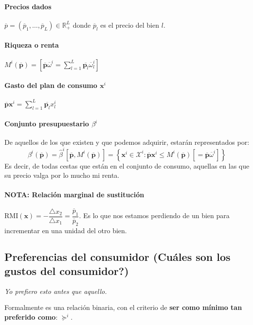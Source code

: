 \paragraph{Precios dados} $\overline{p}= \left(\overline{p}_1,\ldots,\overline{p}_L\right)\in \mathbb{R}^L_+$ donde $\overline{p}_l$ es el precio del bien $l$.
\paragraph{Riqueza o renta} $M^i\left(\overline{\textbf{p}}\right)=\left[\overline{\textbf{p}} \overline{\omega}^i=\displaystyle\sum_{l=1}^L \overline{\textbf{p}_l} \overline{\omega}_l^i\right]$
\paragraph{Gasto del plan de consumo \boldmath$\textbf{x}^i$} $\overline{\textbf{p}}\textbf{x}^i=\displaystyle\sum_{l=1}^L \overline{\textbf{p}_l} x_l^i$
\paragraph{Conjunto presupuestario \boldmath $\beta^i$} De aquellos de los que existen y que podemos adquirir, estarán representados por:
$$\beta^i\left(\overline{\textbf{p}}\right)=\hat{\beta}^i\left[\overline{\textbf{p}},M^i\left(\overline{\textbf{p}}\right)\right]=\left\{\textbf{x}^i\in \mathcal{X}^i:\overline{\textbf{p}}\textbf{x}^i\leq M^i\left(\overline{\textbf{p}}\right)\left[=\overline{\textbf{p}}\overline{\omega}^i\right]\right\}$$
Es decir, de todas cestas que están en el conjunto de consumo, aquellas en las que su precio valga por lo mucho mi renta.
\paragraph{NOTA: Relación marginal de sustitución} $\text{RMI}(\textbf{x})=-\dfrac{\triangle x_2}{\triangle x_1}=\dfrac{\overline{p}_1}{\overline{p}_2}$. Es lo que nos estamos perdiendo de un bien para incrementar en una unidad del otro bien.

\subsection{Preferencias del consumidor (Cuáles son los gustos del consumidor?)}
\begin{center}
    \textit{Yo prefiero esto antes que aquello.}
\end{center}
Formalmente es una relación binaria, con el criterio de \textbf{ser como mínimo tan preferido como}: $\succeq^i$. 

